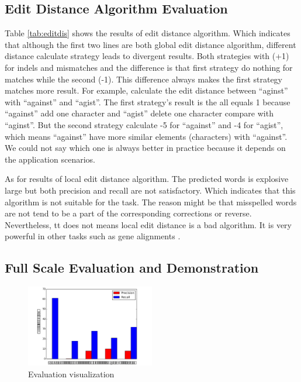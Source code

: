 \documentclass[11pt]{article}
\begin{document}
\subsection{Edit Distance Algorithm Evaluation}

Table \ref{tab:editdis} shows the results of edit distance algorithm. Which indicates that although the first two lines are both global edit distance algorithm, different distance calculate strategy leads to divergent results. Both strategies with (+1) for indels and mismatches and the difference is that first strategy do nothing for matches while the second (-1). This difference always makes the first strategy matches more result. For example, calculate the edit distance between ``aginst'' with ``against'' and ``agist''. The first strategy's result is the all equals 1 because ``against'' add one character and ``agist'' delete one character compare with ``aginst''. But the second strategy calculate -5 for ``against'' and -4 for ``agist'', which means ``against'' have more similar elements (characters) with ``against''. We could not say which one is always better in practice because it depends on the application scenarios.

As for results of local edit distance algorithm. The predicted words is explosive large but both precision and recall are not satisfactory. Which indicates that this algorithm is not suitable for the task. The reason might be that misspelled words are not tend to be a part of the corresponding corrections or reverse. Nevertheless, tt does not means local edit distance is a bad algorithm. It is very powerful in other tasks such as gene alignments \cite{Altschul1986Locally}.

\subsection{Full Scale Evaluation and Demonstration}

\begin{figure}
	\centering
	\includegraphics[width=0.5\textwidth]{img/evaluate.pdf}
	\caption{Evaluation visualization}
	\label{fig:evaluate}
\end{figure}
\end{document}
